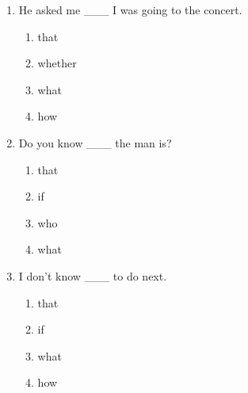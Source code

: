 \documentclass[11pt,a4paper]{ctexart}
\begin{document}
\begin{enumerate}[leftmargin=*,itemsep=4pt]
\begin{enumerate}[label=\Alph*.,leftmargin=2em,itemsep=1pt,topsep=2pt]
\item what
\item how
\end{enumerate}
\item He asked me \_\_\_ I was going to the concert.
\begin{enumerate}[label=\Alph*.,leftmargin=2em,itemsep=1pt,topsep=2pt]
\item that
\item whether
\item what
\item how
\end{enumerate}
\item Do you know \_\_\_ the man is?
\begin{enumerate}[label=\Alph*.,leftmargin=2em,itemsep=1pt,topsep=2pt]
\item that
\item if
\item who
\item what
\end{enumerate}
\item I don't know \_\_\_ to do next.
\begin{enumerate}[label=\Alph*.,leftmargin=2em,itemsep=1pt,topsep=2pt]
\item that
\item if
\item what
\item how
\end{enumerate}
\end{enumerate}

\newpage
\end{document}
